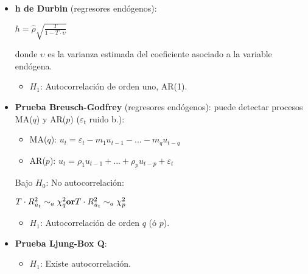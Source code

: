 \documentclass[10pt, a4paper, landscape]{extarticle}
\begin{document}
\begin{multicols}{3}
\begin{itemize}[leftmargin=*]
\begin{itemize}[leftmargin=*]
\begin{center}
				\end{center}
				\item \textbf{h de Durbin} (regresores endógenos):
				\begin{center}
					$h = \hat{\rho} \sqrt{\frac{T}{1 - T \cdot \upsilon}}$
				\end{center}
				donde $\upsilon$ es la varianza estimada del coeficiente asociado a la variable endógena.
				\begin{itemize}[leftmargin=*]
					\item $H_1$: Autocorrelación de orden uno, AR(1).
				\end{itemize}
				\item \textbf{Prueba Breusch-Godfrey} (regresores endógenos): puede detectar procesos MA($q$) y AR($p$) ($\varepsilon_t$ ruido b.):
				\begin{itemize}[leftmargin=*]
					\item MA($q$): $u_t = \varepsilon_t - m_1 u_{t-1} - ... - m_q u_{t-q}$
					\item AR($p$): $u_t = \rho_1 u_{t-1} + ... + \rho_p u_{t-p} + \varepsilon_t$
				\end{itemize}
				Bajo $H_0$: No autocorrelación:
				\begin{center}
					$\hfill T \cdot R^2_{\hat{u}_t} \sim_a \chi^2_q \hfill \textbf{or} \hfill T \cdot R^2_{\hat{u}_t} \sim_a \chi^2_p \hfill$
				\end{center}
				\begin{itemize}[leftmargin=*]
					\item $H_1$: Autocorrelación de orden $q$ (ó $p$).
				\end{itemize}
				\item \textbf{Prueba Ljung-Box Q}:
				\begin{itemize}[leftmargin=*]
					\item $H_1$: Existe autocorrelación.
				\end{itemize}
			\end{itemize}
		\end{itemize}

\end{multicols}
\end{document}
